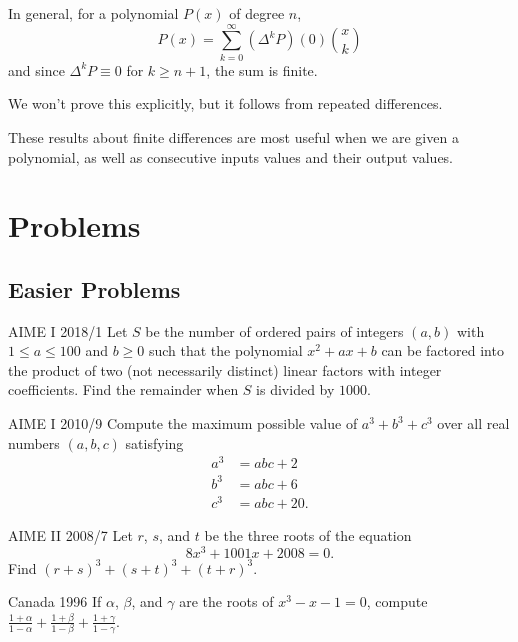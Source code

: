 \documentclass[11pt]{scrartcl}
\begin{document}
\begin{theorem*}
In general, for a polynomial $P(x)$ of degree $n$, \[P(x) = \sum_{k=0}^{\infty} (\Delta^kP)(0)\binom{x}{k}\] and since $\Delta^k P \equiv 0$ for $k \ge n+1$, the sum is finite.
\end{theorem*}

We won’t prove this explicitly, but it follows from repeated differences.

These results about finite differences are most useful when we are given a polynomial, as well as consecutive inputs values and their output values.

\newpage

\section{Problems}

\subsection{Easier Problems}

\begin{problem}[1]{AIME I 2018/1}
Let $S$ be the number of ordered pairs of integers $(a,b)$ with $1 \leq a \leq 100$ and $b \geq 0$ such that the polynomial $x^2+ax+b$ can be factored into the product of two (not necessarily distinct) linear factors with integer coefficients. Find the remainder when $S$ is divided by $1000$.
\end{problem}

\begin{problem}[2]{AIME I 2010/9}
Compute the maximum possible value of $a^3+b^3+c^3$ over all real numbers $(a, b, c)$ satisfying
\begin{align*}
a^3 &= abc+2 \\
b^3 &= abc+6 \\
c^3 &= abc+20.
\end{align*}
\end{problem}

\begin{problem}[3]{AIME II 2008/7}
Let $r$, $s$, and $t$ be the three roots of the equation \[8x^3+1001x+2008=0.\] Find $ (r+s)^3+(s+t)^3+(t+r)^3$.
\end{problem}

\begin{problem}[4]{Canada 1996}
If $\alpha$, $\beta$, and $\gamma$ are the roots of $x^3 - x - 1 = 0$, compute $\frac{1+\alpha}{1-\alpha} + \frac{1+\beta}{1-\beta} + \frac{1+\gamma}{1-\gamma}$.
\end{problem}
\end{document}
